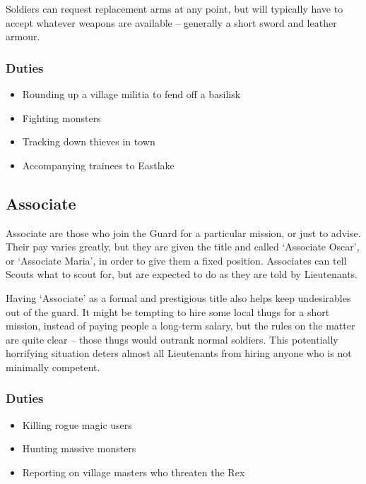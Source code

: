 \begin{multicols}{2}
Soldiers can request replacement arms at any point, but will typically have to accept whatever weapons are available -- generally a short sword and leather armour.

\subsubsection{Duties}

\begin{itemize}

  \item{Rounding up a village militia to fend off a basilisk}
  \item{Fighting monsters}
  \item{Tracking down thieves in town}
  \item{Accompanying trainees to Eastlake}
\end{itemize}

\subsection{Associate}

Associate are those who join the Guard for a particular mission, or just to advise.
Their pay varies greatly, but they are given the title and called `Associate Oscar', or `Associate Maria', in order to give them a fixed position.
Associates can tell Scouts what to scout for, but are expected to do as they are told by Lieutenants.

Having `Associate' as a formal and prestigious title also helps keep undesirables out of the \gls{guard}.
It might be tempting to hire some local thugs for a short mission, instead of paying people a long-term salary, but the rules on the matter are quite clear -- those thugs would outrank normal soldiers.
This potentially horrifying situation deters almost all Lieutenants from hiring anyone who is not minimally competent.

\subsubsection{Duties}

\begin{itemize}
  \item{Killing rogue magic users}
  \item{Hunting massive monsters}
  \item{Reporting on village masters who threaten the Rex}
\end{itemize}


\end{multicols}
